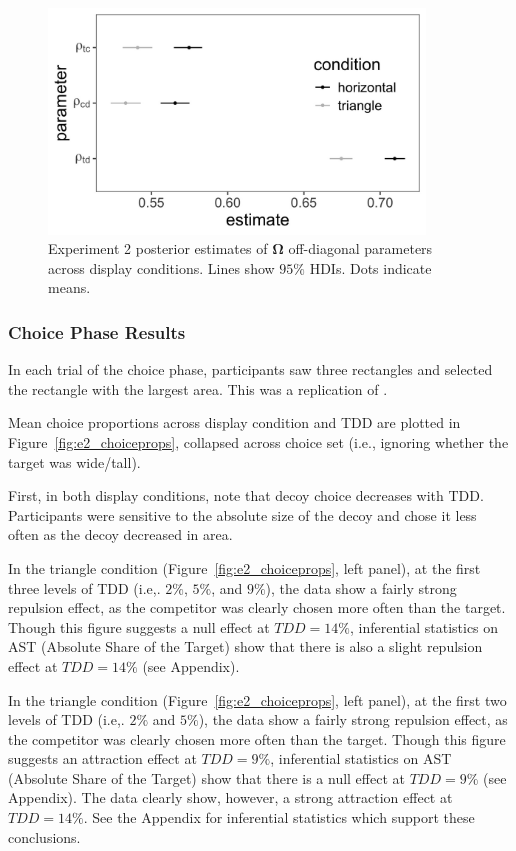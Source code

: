 \begin{figure}
   \includegraphics[width=100mm]{figures/bayes_circle_area_sigma_constant_comp_effect_omega_plot.jpeg}
   \caption{Experiment 2 posterior estimates of $\boldsymbol{\Omega}$ off-diagonal parameters across display conditions. Lines show $95\%$ HDIs. Dots indicate means.}
   \label{fig:e2_omega}
\end{figure}

\subsubsection{Choice Phase Results}

In each trial of the choice phase, participants saw three rectangles and selected the rectangle with the largest area. This was a replication of \textcite{spektorWhenGoodLooks2018b}.

Mean choice proportions across display condition and TDD are plotted in Figure~\ref{fig:e2_choiceprops}, collapsed across choice set (i.e., ignoring whether the target was wide/tall). 

First, in both display conditions, note that decoy choice decreases with TDD. Participants were sensitive to the absolute size of the decoy and chose it less often as the decoy decreased in area. 

In the triangle condition (Figure~\ref{fig:e2_choiceprops}, left panel), at the first three levels of TDD (i.e,. $2\%$, $5\%$, and $9\%$), the data show a fairly strong repulsion effect, as the competitor was clearly chosen more often than the target. Though this figure suggests a null effect at $TDD=14\%$, inferential statistics on AST (Absolute Share of the Target) show that there is also a slight repulsion effect at $TDD=14\%$ (see Appendix). 

In the triangle condition (Figure~\ref{fig:e2_choiceprops}, left panel), at the first two levels of TDD (i.e,. $2\%$ and $5\%$), the data show a fairly strong repulsion effect, as the competitor was clearly chosen more often than the target. Though this figure suggests an attraction effect at $TDD=9\%$, inferential statistics on AST (Absolute Share of the Target) show that there is a null effect at $TDD=9\%$ (see Appendix). The data clearly show, however, a strong attraction effect at $TDD=14\%$. See the Appendix for inferential statistics which support these conclusions.

